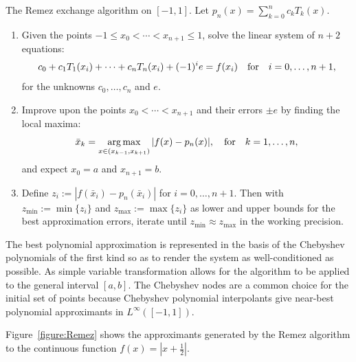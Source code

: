 \begin{algorithm}\label{algorithm:Remez} The Remez exchange algorithm on $[-1,1]$. Let $p_n(x) = \sum_{k=0}^n c_kT_k(x)$.
\begin{enumerate}
\item Given the points $-1\le x_0<\cdots<x_{n+1}\le1$, solve the linear system of $n+2$ equations:
\[ c_0 + c_1 T_1(x_i) + \cdots + c_nT_n(x_i) + (-1)^ie = f(x_i)\quad{\rm for}\quad i=0,\ldots,n+1,
\]
for the unknowns $c_0,\ldots,c_n$ and $e$.
\item Improve upon the points $x_0<\cdots<x_{n+1}$ and their errors $\pm e$ by finding the local maxima:
\[
\bar{x}_k = \argmax_{x\in(x_{k-1},x_{k+1})}|f(x)-p_n(x)|,\quad{\rm for}\quad k=1,\ldots,n,
\]
and expect $x_0=a$ and $x_{n+1}=b$.
\item Define $z_i := |f(\bar{x}_i)-p_n(\bar{x}_i)|$ for $i=0,\ldots,n+1$. Then with $z_{\min} := \min\{z_i\}$ and $z_{\max} := \max\{z_i\}$ as lower and upper bounds for the best approximation errors, iterate until $z_{\min} \approx z_{\max}$ in the working precision.
\end{enumerate}
\end{algorithm}
The best polynomial approximation is represented in the basis of the Chebyshev polynomials of the first kind so as to render the system as well-conditioned as possible. As simple variable transformation allows for the algorithm to be applied to the general interval $[a,b]$. The Chebyshev nodes are a common choice for the initial set of points because Chebyshev polynomial interpolants give near-best polynomial approximants in $L^\infty([-1,1])$.

Figure~\ref{figure:Remez} shows the approximants generated by the Remez algorithm to the continuous function $f(x) = |x+\tfrac{1}{2}|$.

